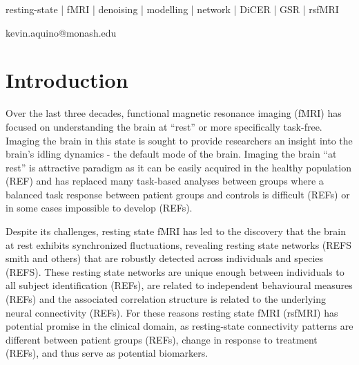 \documentclass[oneside]{zHenriquesLab-StyleBioRxiv}
\begin{document}
\begin{keywords}
resting-state | fMRI | denoising | modelling | network | DiCER | GSR | rsfMRI
\end{keywords}

\begin{corrauthor}
kevin.aquino@monash.edu
\end{corrauthor}


\section*{Introduction}






Over the last three decades, functional magnetic resonance imaging (fMRI) has  focused on understanding the brain at ``rest'' or more specifically task-free. Imaging the brain in this state is sought to provide researchers an insight into the brain's idling dynamics - the default mode of the brain. Imaging the brain ``at rest'' is attractive paradigm as it can be easily acquired in the healthy population (REF) and has replaced many task-based analyses between groups where a balanced task response between patient groups and controls is difficult (REFs) or in some cases impossible to develop (REFs).


Despite its challenges, resting state fMRI has led to the discovery that the brain at rest exhibits synchronized fluctuations, revealing resting state networks (REFS smith and others) that are robustly detected across individuals and species (REFS). These resting state networks are unique enough between individuals to all subject identification (REFs), are related to independent behavioural measures (REFs) and the associated correlation structure is related to the underlying neural connectivity (REFs). For these reasons resting state fMRI (rsfMRI) has potential promise in the clinical domain, as resting-state connectivity patterns are different between patient groups (REFs), change in response to treatment (REFs), and thus serve as potential biomarkers. 
\end{document}
